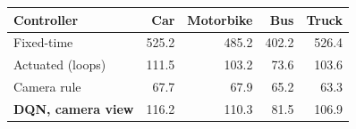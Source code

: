 \begin{tabular}{lrrrr}
\toprule
Controller & Car & Motorbike & Bus & Truck \\
\midrule
Fixed-time & 525.2 & 485.2 & 402.2 & 526.4 \\
Actuated (loops) & 111.5 & 103.2 & 73.6 & 103.6 \\
Camera rule & 67.7 & 67.9 & 65.2 & 63.3 \\
\textbf{DQN, camera view} & 116.2 & 110.3 & 81.5 & 106.9 \\
\bottomrule
\end{tabular}